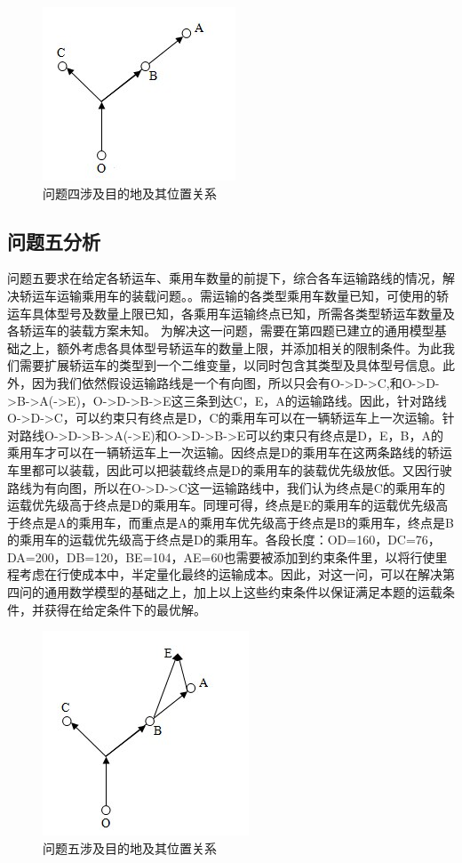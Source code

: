 \documentclass[UTF8，12pt]{ctexart}
\begin{document}
\begin{figure}[h!]
	\centering
	\includegraphics[width=0.3\linewidth]{figure/Q4.png}
	\caption{问题四涉及目的地及其位置关系}
\end{figure}

\subsection{问题五分析}
问题五要求在给定各轿运车、乘用车数量的前提下，综合各车运输路线的情况，解决轿运车运输乘用车的装载问题。。需运输的各类型乘用车数量已知，可使用的轿运车具体型号及数量上限已知，各乘用车运输终点已知，所需各类型轿运车数量及各轿运车的装载方案未知。
为解决这一问题，需要在第四题已建立的通用模型基础之上，额外考虑各具体型号轿运车的数量上限，并添加相关的限制条件。为此我们需要扩展轿运车的类型到一个二维变量，以同时包含其类型及具体型号信息。此外，因为我们依然假设运输路线是一个有向图，所以只会有O->D->C,和O->D->B->A(->E)，O->D->B->E这三条到达C，E，A的运输路线。因此，针对路线O->D->C，可以约束只有终点是D，C的乘用车可以在一辆轿运车上一次运输。针对路线O->D->B->A(->E)和O->D->B->E可以约束只有终点是D，E，B，A的乘用车才可以在一辆轿运车上一次运输。因终点是D的乘用车在这两条路线的轿运车里都可以装载，因此可以把装载终点是D的乘用车的装载优先级放低。又因行驶路线为有向图，所以在O->D->C这一运输路线中，我们认为终点是C的乘用车的运载优先级高于终点是D的乘用车。同理可得，终点是E的乘用车的运载优先级高于终点是A的乘用车，而重点是A的乘用车优先级高于终点是B的乘用车，终点是B的乘用车的运载优先级高于终点是D的乘用车。各段长度：OD=160，DC=76，DA=200，DB=120，BE=104，AE=60也需要被添加到约束条件里，以将行使里程考虑在行使成本中，半定量化最终的运输成本。因此，对这一问，可以在解决第四问的通用数学模型的基础之上，加上以上这些约束条件以保证满足本题的运载条件，并获得在给定条件下的最优解。

\begin{figure}[h!]
	\centering
	\includegraphics[width=0.3\linewidth]{figure/Q5.png}
	\caption{问题五涉及目的地及其位置关系}
\end{figure}
\end{document}
